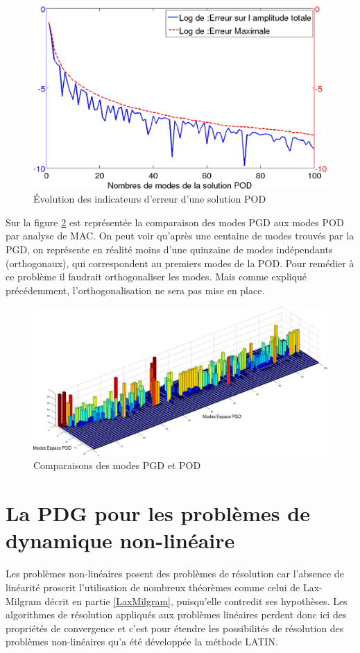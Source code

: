 \documentclass[12pt,a4paper]{report}
\begin{document}
\begin{figure}[!ht]
\centering
\includegraphics[width=0.7\linewidth]{Images/100ModesPOD.eps}
\caption{Évolution des indicateurs d'erreur d'une solution POD \label{DiminutionDeLErreurPOD}}
\end{figure}

Sur la figure \ref{AnalyseDeMAC} est représentée la comparaison des modes PGD aux modes POD par analyse de MAC. On peut voir qu'après une centaine de modes trouvés par la PGD, on représente en réalité moins d'une quinzaine de modes indépendants (orthogonaux), qui correspondent au premiers modes de la POD. Pour remédier à ce problème il faudrait orthogonaliser les modes. Mais comme expliqué précédemment, l'orthogonalisation ne sera pas mise en place.

\begin{figure}[!ht]
\centering
\includegraphics[width=0.8\linewidth]{Images/100ModesAvecNormNonAmortiMAC.eps}
\caption{Comparaisons des modes PGD et POD \label{AnalyseDeMAC}}
\end{figure}





\chapter{La PDG pour les problèmes de dynamique non-linéaire}
Les problèmes non-linéaires posent des problèmes de résolution car l'absence de linéarité proscrit l'utilisation de nombreux théorèmes comme celui de Lax-Milgram décrit en partie \ref{LaxMilgram}, puisqu'elle contredit ses hypothèses. Les algorithmes de résolution appliqués aux problèmes linéaires perdent donc ici des propriétés de convergence et c'est pour étendre les possibilités de résolution des problèmes non-linéaires qu'a été développée la méthode
LATIN.
\end{document}
